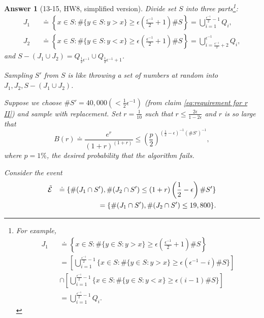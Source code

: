 \documentclass[11pt]{article}
\theoremstyle{numberplain}
\theoremstyle{nonumberplain}
\newtheorem{ans}{Answer}
\newcommand{\0}{{\mathbf{0}}}
\begin{document}
\begin{ans}[13-15, HW8, simplified version]
\def\ev{\tilde{{\cal E}}}
Divide set $S$ into three parts\footnote{ For example, 
\begin{eqnarray*}
J_1&& 
\doteq \left\{x\in S:\# \{y\in S:y> x\}\geq \epsilon \left(\frac{\epsilon^{-1}}{2} + 1 \right) \# S \right\} \\
&& =\left[ \bigcup_{i=1}^{\frac{\epsilon^{-1}}{2}-1}\{x\in S:\# \{y\in S:y> x\}\geq \epsilon (\epsilon^{-1}-i)\# S  \}\right]\\
&& \cap  \left[ \bigcup_{i=1}^{\frac{\epsilon^{-1}}{2}-1} \{x\in S:\# \{y\in S:y< x\}\geq \epsilon (i-1) \# S \}\right]
\\
&& =\bigcup_{i=1}^{\frac{\epsilon^{-1}}{2}-1} Q_i.
\end{eqnarray*}
}:
\begin{eqnarray*}
J_1&& 
\doteq \left\{x\in S:\# \{y\in S:y> x\}\geq \epsilon \left(\frac{\epsilon^{-1}}{2} + 1 \right) \# S \right\}  =
\bigcup_{i=1}^{\frac{\epsilon^{-1}}{2}-1} Q_i,\\
J_2&& \doteq \left\{x\in S:\# \{y\in S:y< x\}\geq \epsilon \left(\frac{\epsilon^{-1}}{2} + 1 \right) \# S \right\}
 =\bigcup_{i= \frac{\epsilon^{-1}}{2}+2}^{\epsilon^{-1}} Q_i,
\end{eqnarray*}
and $S-(J_1\cup J_2)=Q_{\frac12\epsilon^{-1}} \cup Q_{\frac12 \epsilon^{-1}+1}$.


Sampling $S'$ from $S$ is like throwing a set of numbers at random into $J_1,J_2,S-(J_1\cup J_2)$.

Suppose we choose $\#S' = 40,000( <\frac12 \epsilon^{-1})$ (from claim \ref{eq:requirement for r II}) and sample with replacement. Set $r=\frac{1}{10}$ such that $r\leq \frac{2\epsilon  }{1-2\epsilon}$ and $r$  is so large that
\begin{equation}
B(r)\doteq \frac{e^r}{(1+r)^{(1+r)}}\leq \left( \frac{ p}{ 2 } \right)^{\left(\frac{1}{2}-\epsilon \right)^{-1}(\# S')^{-1}},
\label{eq:condition for r II}
\end{equation}
where $p=1\%$, the desired probability that the algorithm fails. 



Consider the event 
\begin{eqnarray*}
\ev && \doteq \{%
\#(J_1\cap S'), \#(J_2\cap S') \leq (1+r)\left(\frac{1}{2} -\epsilon\right) \#S' \}\\
&& =\{%
\#(J_1\cap S'), \#(J_2\cap S') \leq   19,800\}.
\end{eqnarray*}


\end{ans}
\end{document}
